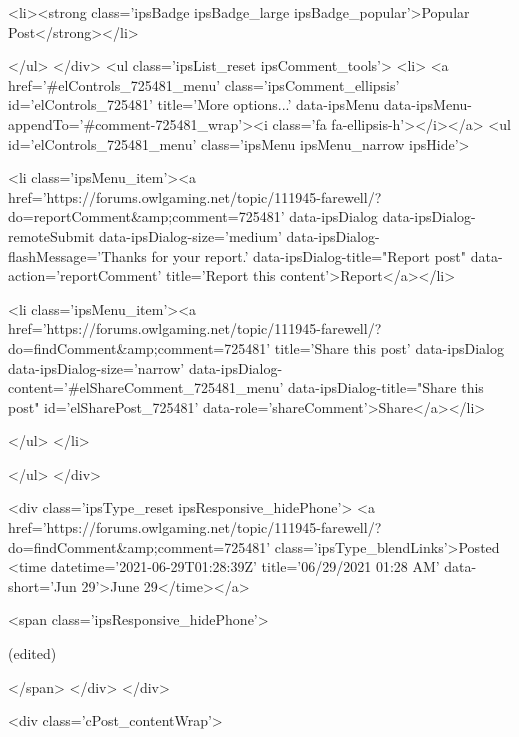 					
					
					
					
						<li><strong class='ipsBadge ipsBadge_large ipsBadge_popular'>Popular Post</strong></li>
					
				</ul>
			</div>
			<ul class='ipsList_reset ipsComment_tools'>
				<li>
					<a href='#elControls_725481_menu' class='ipsComment_ellipsis' id='elControls_725481' title='More options...' data-ipsMenu data-ipsMenu-appendTo='#comment-725481_wrap'><i class='fa fa-ellipsis-h'></i></a>
					<ul id='elControls_725481_menu' class='ipsMenu ipsMenu_narrow ipsHide'>
						
							<li class='ipsMenu_item'><a href='https://forums.owlgaming.net/topic/111945-farewell/?do=reportComment&amp;comment=725481' data-ipsDialog data-ipsDialog-remoteSubmit data-ipsDialog-size='medium' data-ipsDialog-flashMessage='Thanks for your report.' data-ipsDialog-title="Report post" data-action='reportComment' title='Report this content'>Report</a></li>
						
						
							<li class='ipsMenu_item'><a href='https://forums.owlgaming.net/topic/111945-farewell/?do=findComment&amp;comment=725481' title='Share this post' data-ipsDialog data-ipsDialog-size='narrow' data-ipsDialog-content='#elShareComment_725481_menu' data-ipsDialog-title="Share this post" id='elSharePost_725481' data-role='shareComment'>Share</a></li>
						
                        
						
						
						
							
								
							
							
							
							
							
							
						
					</ul>
				</li>
				
			</ul>
		</div>

		<div class='ipsType_reset ipsResponsive_hidePhone'>
			<a href='https://forums.owlgaming.net/topic/111945-farewell/?do=findComment&amp;comment=725481' class='ipsType_blendLinks'>Posted <time datetime='2021-06-29T01:28:39Z' title='06/29/2021 01:28  AM' data-short='Jun 29'>June 29</time></a> 
			
			<span class='ipsResponsive_hidePhone'>
				
					(edited)
				
				
			</span>
		</div>
	</div>

	

    

	<div class='cPost_contentWrap'>
		
